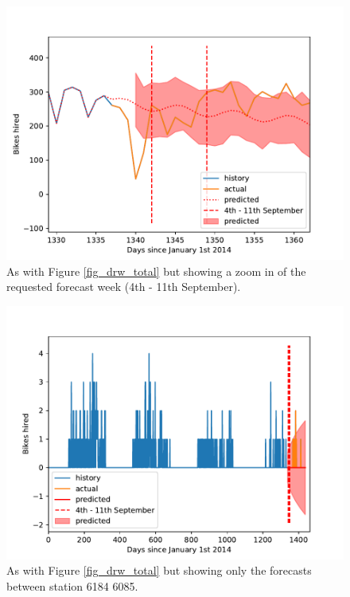 \documentclass[10pt]{article}
\begin{document}
\begin{figure}
\includegraphics[scale=1.0,angle=0,trim=0cm 0cm 0cm 0cm]{drw_zoom_ts.pdf}
\caption{As with Figure \ref{fig_drw_total} but showing a zoom in of the requested forecast week (4th - 11th September).}
\label{fig_drw_zoom}
\end{figure}





\begin{figure}
\includegraphics[scale=1.0,angle=0,trim=0cm 0cm 0cm 0cm]{arma_specstat_total.pdf}
\caption{As with Figure \ref{fig_drw_total} but showing only the forecasts between station 6184 6085.}
\label{fig_arma_station_total}
\end{figure}
\end{document}
